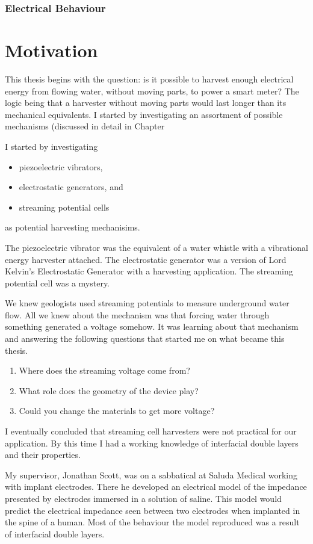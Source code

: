   \subsubsection*{Electrical Behaviour}

\section{Motivation}
  This thesis begins with the question: is it possible to harvest enough electrical energy from flowing water, without moving parts, to power a smart meter?
  The logic being that a harvester without moving parts would last longer than its mechanical equivalents.
  I started by investigating an assortment of possible mechanisms (discussed in detail in Chapter

  I started by investigating
  \begin{itemize}
    \item piezoelectric vibrators,
    \item electrostatic generators, and
    \item streaming potential cells
  \end{itemize}
  as potential harvesting mechanisims.

  The piezoelectric vibrator was the equivalent of a water whistle with a vibrational energy harvester attached.
  The electrostatic generator was a version of Lord Kelvin's Electrostatic Generator with a harvesting application.
  The streaming potential cell was a mystery.

  We knew geologists used streaming potentials to measure underground water flow.
  All we knew about the mechanism was that forcing water through something generated a voltage somehow.
  It was learning about that mechanism and answering the following questions that started me on what became this thesis.
  \begin{enumerate}
    \item Where does the streaming voltage come from?
    \item What role does the geometry of the device play?
    \item Could you change the materials to get more voltage?
  \end{enumerate}
  I eventually concluded that streaming cell harvesters were not practical for our application.
  By this time I had a working knowledge of interfacial double layers and their properties.

  My supervisor, Jonathan Scott, was on a sabbatical at Saluda Medical working with implant electrodes.
  There he developed an electrical model of the impedance presented by electrodes immersed in a solution of saline.
  This model would predict the electrical impedance seen between two electrodes when implanted in the spine of a human.
  Most of the behaviour the model reproduced was a result of interfacial double layers.

